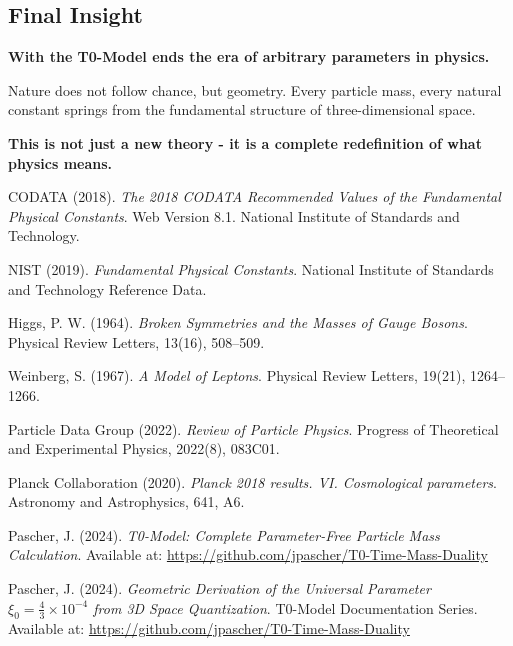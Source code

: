 \documentclass[12pt,a4paper]{article}
\begin{document}
	\subsection{Final Insight}
	
	\begin{tcolorbox}[colback=orange!5!white,colframe=orange!75!black,title=The End of Arbitrariness]
		\textbf{With the T0-Model ends the era of arbitrary parameters in physics.}
		
		Nature does not follow chance, but geometry. Every particle mass, every natural constant springs from the fundamental structure of three-dimensional space.
		
		\textbf{This is not just a new theory - it is a complete redefinition of what physics means.}
	\end{tcolorbox}
	
	\newpage
	\begin{thebibliography}{99}
		
		CODATA (2018). \textit{The 2018 CODATA Recommended Values of the Fundamental Physical Constants}. 
		Web Version 8.1. National Institute of Standards and Technology.
		
		NIST (2019). \textit{Fundamental Physical Constants}. 
		National Institute of Standards and Technology Reference Data.
		
		Higgs, P. W. (1964). \textit{Broken Symmetries and the Masses of Gauge Bosons}. 
		Physical Review Letters, 13(16), 508–509.
		
		Weinberg, S. (1967). \textit{A Model of Leptons}. 
		Physical Review Letters, 19(21), 1264–1266.
		
		Particle Data Group (2022). \textit{Review of Particle Physics}. 
		Progress of Theoretical and Experimental Physics, 2022(8), 083C01.
		
		Planck Collaboration (2020). \textit{Planck 2018 results. VI. Cosmological parameters}. 
		Astronomy and Astrophysics, 641, A6.
		
		Pascher, J. (2024). \textit{T0-Model: Complete Parameter-Free Particle Mass Calculation}. 
		Available at: \url{https://github.com/jpascher/T0-Time-Mass-Duality}
		
		Pascher, J. (2024). \textit{Geometric Derivation of the Universal Parameter $\xi_0 = \frac{4}{3} \times 10^{-4}$ from 3D Space Quantization}. 
		T0-Model Documentation Series. Available at: \url{https://github.com/jpascher/T0-Time-Mass-Duality}
		
	\end{thebibliography}
	
\end{document}
